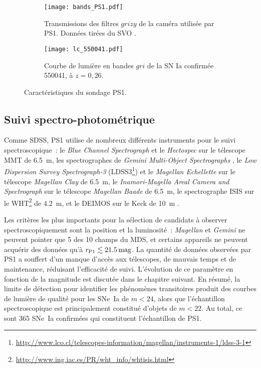\documentclass[../main/main.tex]{subfiles}
\begin{document}
\begin{figure}[ht]
    \centering
    \begin{subfigure}[]{.49\linewidth}
        \centering
        \texttt{[image: bands\_PS1.pdf]}
        \caption{Transmissions des filtres $grizy$ de la caméra utilisée par
        PS1. Données tirées du SVO \citep{rodrigo2020}.}
        \label{fig:ps1bands}
    \end{subfigure}
    \begin{subfigure}[]{.49\linewidth}
        \centering
        \texttt{[image: lc\_550041.pdf]}
        \caption{Courbe de lumière en bandes $gri$ de la SN Ia confirmée 550041,
        à $z = 0,26$.}
        \label{fig:lc_550041}
    \end{subfigure}
    \caption{Caractéristiques du sondage PS1.}
\end{figure}

\subsection{Suivi spectro-photométrique}\label{ssec:ps1spectro}

Comme SDSS, PS1 utilise de nombreux différents instruments pour le suivi
spectroscopique~: le \textit{Blue Channel Spectrograph} \citep{schmidt1989} et
le \textit{Hectospec} \citep{fabricant2005} sur le télescope MMT de \SI{6,5}{m},
les spectrographes de \textit{Gemini Multi-Object Spectrographs}
\citep[GMOS,][]{hook2004}, le \textit{Low Dispersion Survey Spectrograph-3}
(LDSS3\footnote{\href{http://www.lco.cl/telescopes-information/magellan/instruments-1/ldss-3-1}
{http://www.lco.cl/telescopes-information/magellan/instruments-1/ldss-3-1}}) et
le \textit{Magellan Echellette} \citep[MagE,][]{marshall2008} sur le télescope
\textit{Magellan Clay} de \SI{6,5}{m}, le \textit{Inamori-Magella Areal Camera
and Spectrograph} \citep[IMACS,][]{dressler2011} sur le télescope
\textit{Magellan Baade} de \SI{6,5}{m}, le spectrographe ISIS sur le
WHT\footnote{\href{http://www.ing.iac.es/PR/wht_info/whtisis.html}
{http://www.ing.iac.es/PR/wht\_info/whtisis.html}} de \SI{4,2}{m}, et le DEIMOS
\citep{faber2003} sur le Keck de \SI{10}{m} \citep{oke1995}.

Les critères les plus importants pour la sélection de candidats à observer
spectroscopiquement sont la position et la luminosité~: \textit{Magellan} et
\textit{Gemini} ne peuvent pointer que 5 des 10 champs du MDS, et certains
appareils ne peuvent acquérir des données qu'à $r_{\rm P1} \lesssim
\SI{21,5}{mag}$. La quantité de données observées par PS1 a souffert d'un manque
d'accès aux télescopes, de mauvais temps et de maintenance, réduisant
l'efficacité de suivi. L'évolution de ce paramètre en fonction de la magnitude
est discutée dans le chapitre suivant. En résumé, la limite de détection pour
identifier les phénomènes transitoires produit des courbes de lumière de qualité
pour les SNe~Ia de $m < 24$, alors que l'échantillon spectroscopique est
principalement constitué d'objets de $m < 22$. Au total, ce sont 365 SNe~Ia
confirmées qui constituent l'échantillon de PS1.
\end{document}
